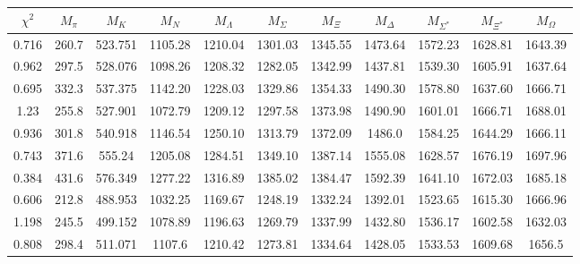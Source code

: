 \documentclass[10pt,a4paper]{article}
\begin{document}
						
					\begin{table}[h!]\small
						\begin{tabular}{ccccccccccc}
							 $\chi^2$ & $M_\pi$ & $M_K$ & $M_N$ & $M_{\Lambda}$ & $M_{\Sigma}$ &$M_{\Xi}$ & $M_{\Delta}$ & $M_{\Sigma^*}$ & $M_{\Xi^*}$ & $M_{\Omega}$ \\ 
							\hline 0.716 & 260.7 & 523.751 & 1105.28 & 1210.04  & 1301.03 & 1345.55 & 1473.64 & 1572.23 & 1628.81 & 1643.39 \\ 
							0.962 & 297.5 & 528.076 & 1098.26 & 1208.32 & 1282.05 & 1342.99 &1437.81 & 1539.30 & 1605.91 & 1637.64 \\ 
							0.695 & 332.3 & 537.375 & 1142.20 & 1228.03 & 1329.86 & 1354.33 & 1490.30 & 1578.80 & 1637.60 & 1666.71 \\ 
							\hline 1.23 & 255.8 & 527.901 & 1072.79 & 1209.12 & 1297.58 & 1373.98 & 1490.90 & 1601.01 & 1666.71 & 1688.01 \\  
							0.936 & 301.8 & 540.918 & 1146.54 & 1250.10 & 1313.79 & 1372.09 & 1486.0 & 1584.25 & 1644.29 & 1666.11 \\  
							0.743 & 371.6 & 555.24 & 1205.08 & 1284.51 & 1349.10 & 1387.14 & 1555.08 & 1628.57 & 1676.19 & 1697.96 \\  
							 0.384 & 431.6 & 576.349 & 1277.22 & 1316.89 & 1385.02 & 1384.47 & 1592.39 & 1641.10 & 1672.03 & 1685.18 \\  
							 \hline 0.606 & 212.8 & 488.953 & 1032.25 & 1169.67 & 1248.19 & 1332.24 & 1392.01 &  1523.65 & 1615.30 & 1666.96\\  
							1.198 & 245.5 & 499.152 & 1078.89 & 1196.63 & 1269.79 & 1337.99 & 1432.80 & 1536.17 & 1602.58 & 1632.03 \\  
							0.808 & 298.4 & 511.071 & 1107.6 & 1210.42 & 1273.81 & 1334.64 & 1428.05 & 1533.53 & 1609.68 & 1656.5 \\ 
							\hline
							\end{tabular} 
							\end{table}
\end{document}
